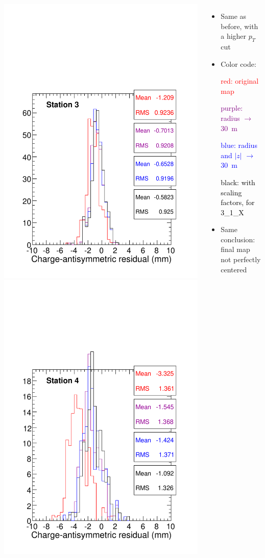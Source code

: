 \documentclass[compress]{beamer}
\begin{document}
\begin{frame}
\begin{columns}
\includegraphics[width=0.5\linewidth]{station3_ptcut90.pdf}
\includegraphics[width=0.5\linewidth]{station4_ptcut90.pdf}

\scriptsize
\begin{itemize}
\item Same as before, with a higher $p_T$ cut
\item Color code:

\textcolor{red}{red: original map}

\textcolor{purple}{purple: radius $\to$ 30~m}

\textcolor{blue}{blue: radius and $|z|$ $\to$ 30~m}

\textcolor{black}{black: with scaling factors, for 3\_1\_X}

\item Same conclusion: final map not perfectly centered
\end{itemize}
\end{columns}
\end{frame}
\end{document}
